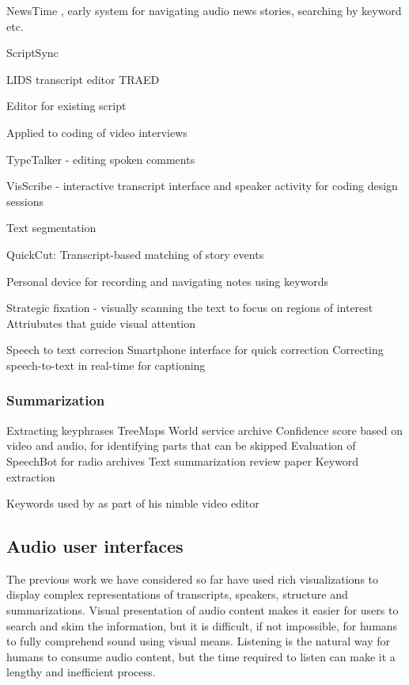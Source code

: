 NewsTime \citep{Horner1993}, early system for navigating audio news stories, searching by keyword etc.

ScriptSync \citep{Avid2011}

LIDS transcript editor \citep{Apperley2002}
TRAED \citep{Masoodian2006}

Editor for existing script \citep{Shin2016}

Applied to coding of video interviews \cite{Chandrasegaran2017}

TypeTalker - editing spoken comments \citep{Arawjo2017}

VisScribe - interactive transcript interface and speaker activity for coding design sessions \cite{Chandrasegaran2017}

Text segmentation \citep{Choi2000}

QuickCut: Transcript-based matching of story events \citep{Truong2016}

Personal device for recording and navigating notes using keywords \citep{Tucker2003}

Strategic fixation - visually scanning the text to focus on regions of interest \citep{Whittaker2007}
Attriubutes that guide visual attention \citep{Wolfe2004}

Speech to text correcion 
\citep{Burke2006}
\citep{Liang2014}
\citep{Suhm2001}
\citep{Wald2007}
Smartphone interface for quick correction \citep{Liang2014}
Correcting speech-to-text in real-time for captioning \citep{Wald2007}

\subsubsection{Summarization}

Extracting keyphrases \citep{Inkpen2004}
TreeMaps \citep{Abdulhamid2013,Abdulhamid2013a}
World service archive \citep{Raimond2014}
Confidence score based on video and audio, for identifying parts that can be skipped \citep{Foote1998}
Evaluation of SpeechBot for radio archives \citep{Kim2003}
Text summarization review paper \citep{Lloret2012}
Keyword extraction \citep{Matsuo2004}

Keywords used by \citet{Loviscach2011a} as part of his nimble video editor

\subsection{Audio user interfaces}

The previous work we have considered so far have used rich visualizations to display complex representations of
transcripts, speakers, structure and summarizations. Visual presentation of audio content makes it easier for users to
search and skim the information, but it is difficult, if not impossible, for humans to fully comprehend sound using
visual means. Listening is the natural way for humans to consume audio content, but the time required to listen can
make it a lengthy and inefficient process.

